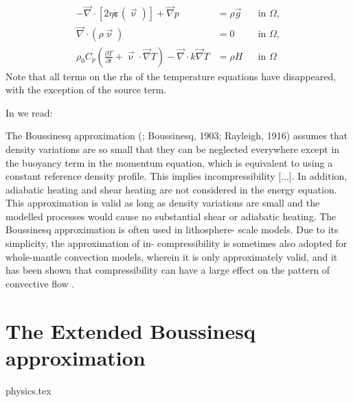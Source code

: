 \begin{align}
  \label{eq:stokes-1a}
  -\vec\nabla \cdot \left[2\eta \dot{\bm \varepsilon}(\vec\upnu)
                \right] + \vec\nabla p &=
  \rho \vec{g}
  &
  & \textrm{in $\Omega$},
  \\
  \label{eq:stokes-2a}
  \vec\nabla \cdot (\rho \vec\upnu) &= 0
  &
  & \textrm{in $\Omega$},
  \\
  \label{eq:temperaturee}
  \rho_0 C_p \left(\frac{\partial T}{\partial t} + \vec\upnu \cdot\vec\nabla T\right)
  - \vec\nabla\cdot k\vec\nabla T
  &=
  \rho H
  &
  & \textrm{in $\Omega$}
\end{align}
Note that all terms on the rhs of the temperature equations have disappeared, with the exception 
of the source term.


In \textcite{vacp22} we read: 
\begin{displayquote}
The Boussinesq approximation (\textcite{ober79}; Boussinesq, 1903; Rayleigh, 1916) 
assumes that density
variations are so small that they can be neglected everywhere
except in the buoyancy term in the momentum equation, 
which is equivalent to using a constant reference density profile. 
This implies incompressibility [...]. In addition, adiabatic heating
and shear heating are not considered in the energy equation. 
This approximation is valid as long as density variations are small 
and the modelled processes would cause no substantial 
shear or adiabatic heating.
The Boussinesq approximation is often used in lithosphere-
scale models. Due to its simplicity, the approximation of in-
compressibility is sometimes also adopted for whole-mantle
convection models, wherein it is only approximately valid,
and it has been shown that compressibility can have a large
effect on the pattern of convective flow \cite{tack96}.
\end{displayquote}


\section{The Extended Boussinesq approximation}
\begin{flushright} {\tiny {\color{gray} physics.tex}} \end{flushright}


